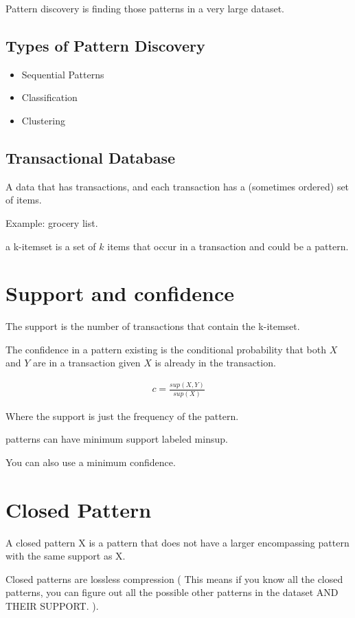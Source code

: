 \documentclass[fleqn]{report}
\newcommand{\equations} [1] {
\begin{gather*}
#1
\end{gather*}
}
\begin{document}
Pattern discovery is finding those patterns in a very large 
dataset. 

\subsection{Types of Pattern Discovery}
\begin{itemize}
    \item 
    Sequential Patterns 
    \item 
    Classification 
    \item 
    Clustering
\end{itemize}

\subsection{Transactional Database}
A data that has transactions, and each 
transaction has a (sometimes ordered) set of items. 

Example: grocery list. 

a k-itemset is a set of $k$ items that 
occur in a transaction and could be a pattern. 




\section{Support and confidence}
The support is the number of transactions that 
contain the k-itemset.



The confidence in a pattern existing is the conditional 
probability that both $X$ and $Y$ are in a transaction 
given $X$ is already in the transaction.

\equations{
    c = 
    \frac{sup(X, Y)}{sup(X)}
}

Where the support is just the frequency of the pattern. 

patterns can have minimum support labeled minsup.

You can also use a minimum confidence.

\section{Closed Pattern}
A closed pattern X is a pattern that does not have a larger encompassing pattern 
with the same support as X.

Closed patterns are lossless compression (
    This means if you know all the closed patterns, you can 
    figure out all the possible other patterns in the 
    dataset AND THEIR SUPPORT. 
). 
\end{document}
